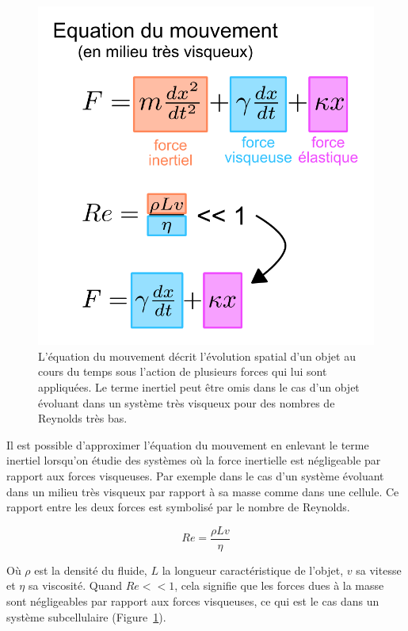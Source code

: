 \documentclass[12pt,a4paper,twoside,openright]{book}
\begin{document}
\begin{figure}[htbp]
\centering
\includegraphics{figures/intro/motion_equation.png}
\caption{\label{fig:motion_equation}L'équation du mouvement décrit
l'évolution spatial d'un objet au cours du temps sous l'action de
plusieurs forces qui lui sont appliquées. Le terme inertiel peut être
omis dans le cas d'un objet évoluant dans un système très visqueux pour
des nombres de Reynolds très bas.}
\end{figure}

Il est possible d'approximer l'équation du mouvement en enlevant le
terme inertiel lorsqu'on étudie des systèmes où la force inertielle est
négligeable par rapport aux forces visqueuses. Par exemple dans le cas
d'un système évoluant dans un milieu très visqueux par rapport à sa
masse comme dans une cellule. Ce rapport entre les deux forces est
symbolisé par le nombre de Reynolds.

\[
Re = \frac{\rho Lv}{\eta}
\]

Où \(\rho\) est la densité du fluide, \(L\) la longueur caractéristique
de l'objet, \(v\) sa vitesse et \(\eta\) sa viscosité. Quand
\(Re << 1\), cela signifie que les forces dues à la masse sont
négligeables par rapport aux forces visqueuses, ce qui est le cas dans
un système subcellulaire (Figure~\ref{fig:motion_equation}).
\end{document}
